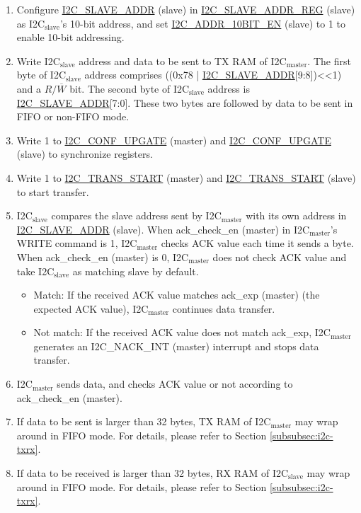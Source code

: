 \documentclass[main\_\_EN.tex]{subfiles}
\begin{document}
\begin{enumerate}
\item Configure \hyperref[fielddesc:I2CSLAVEADDR]{I2C\_SLAVE\_ADDR} (slave) in \hyperref[regdesc:I2CSLAVEADDRREG]{I2C\_SLAVE\_ADDR\_REG} (slave) as I2C$_\text{slave}$'s 10-bit address, and set \hyperref[fielddesc:I2CADDR10BITEN]{I2C\_ADDR\_10BIT\_EN} (slave) to 1 to enable 10-bit addressing.
\item Write I2C$_\text{slave}$ address and data to be sent to TX RAM of I2C$_\text{master}$. The first byte of I2C$_\text{slave}$ address comprises ((0x78 | \hyperref[fielddesc:I2CSLAVEADDR]{I2C\_SLAVE\_ADDR}[9:8])<<1) and a $R/\overline W$ bit. The second byte of I2C$_\text{slave}$ address is \hyperref[fielddesc:I2CSLAVEADDR]{I2C\_SLAVE\_ADDR}[7:0]. These two bytes are followed by data to be sent in FIFO or non-FIFO mode.
\item Write 1 to \hyperref[fielddesc:I2CCONFUPGATE]{I2C\_CONF\_UPGATE} (master) and \hyperref[fielddesc:I2CCONFUPGATE]{I2C\_CONF\_UPGATE} (slave) to synchronize registers.
\item Write 1 to \hyperref[fielddesc:I2CTRANSSTART]{I2C\_TRANS\_START} (master) and \hyperref[fielddesc:I2CTRANSSTART]{I2C\_TRANS\_START} (slave) to start transfer.
\item I2C$_\text{slave}$ compares the slave address sent by I2C$_\text{master}$ with its own address in \hyperref[fielddesc:I2CSLAVEADDR]{I2C\_SLAVE\_ADDR} (slave). When ack\_check\_en (master) in I2C$_\text{master}$'s WRITE command is 1, I2C$_\text{master}$ checks ACK value each time it sends a byte. When ack\_check\_en (master) is 0, I2C$_\text{master}$ does not check ACK value and take I2C$_\text{slave}$ as matching slave by default.
\begin{itemize}
\item Match: If the received ACK value matches ack\_exp (master) (the expected ACK value), I2C$_\text{master}$ continues data transfer.
\item Not match: If the received ACK value does not match ack\_exp, I2C$_\text{master}$ generates an I2C\_NACK\_INT (master) interrupt and stops data transfer.
\end{itemize}

\item I2C$_\text{master}$ sends data, and checks ACK value or not according to ack\_check\_en (master).
\item If data to be sent is larger than 32 bytes, TX RAM of I2C$_\text{master}$ may wrap around in FIFO mode. For details, please refer to Section \ref{subsubsec:i2c-txrx}. 
\item If data to be received is larger than 32 bytes, RX RAM of I2C$_\text{slave}$ may wrap around in FIFO mode. For details, please refer to Section \ref{subsubsec:i2c-txrx}. 


\end{enumerate}
\end{document}
